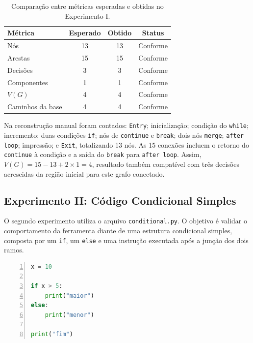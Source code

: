 \begin{table}[H]
    \centering
    \caption{Comparação entre métricas esperadas e obtidas no Experimento I.}
    \begin{tabular}{l | c | c | c}
        \hline
        \textbf{Métrica} & \textbf{Esperado} & \textbf{Obtido} & \textbf{Status} \\ \hline
        Nós & 13 & 13 & Conforme \\ \hline
        Arestas & 15 & 15 & Conforme \\ \hline
        Decisões & 3 & 3 & Conforme \\ \hline
        Componentes & 1 & 1 & Conforme \\ \hline
        \(V(G)\) & 4 & 4 & Conforme \\ \hline
        Caminhos da base & 4 & 4 & Conforme \\ \hline
    \end{tabular}
    \label{tab:experimento1_guy}
\end{table}

Na reconstrução manual foram contados: \texttt{Entry}; inicialização; condição do \texttt{while}; incremento; duas condições \texttt{if}; nós de \texttt{continue} e \texttt{break}; dois nós \texttt{merge}; \texttt{after loop}; impressão; e \texttt{Exit}, totalizando 13 nós. As 15 conexões incluem o retorno do \texttt{continue} à condição e a saída do \texttt{break} para \texttt{after loop}. Assim, \(V(G) = 15 - 13 + 2 \times 1 = 4\), resultado também compatível com três decisões acrescidas da região inicial para este grafo conectado.

\subsection{Experimento II: Código Condicional Simples}

O segundo experimento utiliza o arquivo \texttt{conditional.py}. O objetivo é validar o comportamento da ferramenta diante de uma estrutura condicional simples, composta por um \texttt{if}, um \texttt{else} e uma instrução executada após a junção dos dois ramos.

\begin{lstlisting}[language=Python, numbers=left, caption={Código utilizado no Experimento II.}, label={lst:experimento2_codigo}]
x = 10

if x > 5:
    print("maior")
else:
    print("menor")

print("fim")
\end{lstlisting}

